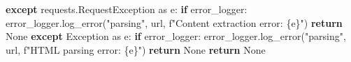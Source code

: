 \documentclass[
  titlepage]{article}
\newenvironment{Shaded}{\begin{snugshade}}{\end{snugshade}}
\newcommand{\ControlFlowTok}[1]{\textcolor[rgb]{0.00,0.23,0.31}{\textbf{#1}}}
\newcommand{\ImportTok}[1]{\textcolor[rgb]{0.00,0.46,0.62}{#1}}
\newcommand{\NormalTok}[1]{\textcolor[rgb]{0.00,0.23,0.31}{#1}}
\newcommand{\PreprocessorTok}[1]{\textcolor[rgb]{0.68,0.00,0.00}{#1}}
\newcommand{\SpecialCharTok}[1]{\textcolor[rgb]{0.37,0.37,0.37}{#1}}
\newcommand{\SpecialStringTok}[1]{\textcolor[rgb]{0.13,0.47,0.30}{#1}}
\newcommand{\StringTok}[1]{\textcolor[rgb]{0.13,0.47,0.30}{#1}}
\newcommand{\VariableTok}[1]{\textcolor[rgb]{0.07,0.07,0.07}{#1}}
\begin{document}
\begin{Shaded}
\begin{Highlighting}[]
    \ControlFlowTok{except}\NormalTok{ requests.RequestException }\ImportTok{as}\NormalTok{ e:}
        \ControlFlowTok{if}\NormalTok{ error\_logger:}
\NormalTok{            error\_logger.log\_error(}\StringTok{"parsing"}\NormalTok{, url, }\SpecialStringTok{f"Content extraction error: }\SpecialCharTok{\{}\NormalTok{e}\SpecialCharTok{\}}\SpecialStringTok{"}\NormalTok{)}
        \ControlFlowTok{return} \VariableTok{None}
    \ControlFlowTok{except} \PreprocessorTok{Exception} \ImportTok{as}\NormalTok{ e:}
        \ControlFlowTok{if}\NormalTok{ error\_logger:}
\NormalTok{            error\_logger.log\_error(}\StringTok{"parsing"}\NormalTok{, url, }\SpecialStringTok{f"HTML parsing error: }\SpecialCharTok{\{}\NormalTok{e}\SpecialCharTok{\}}\SpecialStringTok{"}\NormalTok{)}
        \ControlFlowTok{return} \VariableTok{None}
    \ControlFlowTok{return} \VariableTok{None}
\end{Highlighting}
\end{Shaded}
\end{document}

